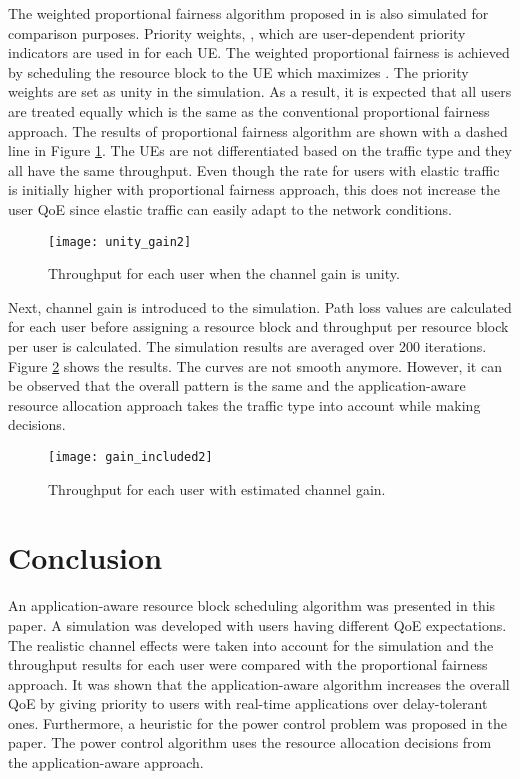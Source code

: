 \documentclass[journal]{IEEEtran} 				\IEEEoverridecommandlockouts 	\usepackage{amsmath,amssymb}
\begin{document}
The weighted proportional fairness algorithm proposed in \cite{SelfOrganizedLTE} is also simulated for comparison purposes. Priority weights, , which are user-dependent priority indicators are used in \cite{SelfOrganizedLTE} for each UE. The weighted proportional fairness is achieved by scheduling the resource block to the UE which maximizes . The priority weights are set as unity in the simulation. As a result, it is expected that all users are treated equally which is the same as the conventional proportional fairness approach. The results of proportional fairness algorithm are shown with a dashed line in Figure \ref{fig:sim:UnityGain}. The UEs are not differentiated based on the traffic type and they all have the same throughput. Even though the rate for users with elastic traffic is initially higher with proportional fairness approach, this does not increase the user QoE since elastic traffic can easily adapt to the network conditions.  
 
\begin{figure}
    \centering
    \texttt{[image: unity\_gain2]}
    \captionsetup{justification=centering}
    \caption{Throughput for each user when the channel gain is unity.}
    \label{fig:sim:UnityGain}
\end{figure} 

Next, channel gain is introduced to the simulation. Path loss values are calculated for each user before assigning a resource block and throughput per resource block per user is calculated. The simulation results are averaged over 200 iterations. Figure \ref{fig:sim:GainIncluded} shows the results. The curves are not smooth anymore. However, it can be observed that the overall pattern is the same and the application-aware resource allocation approach takes the traffic type into account while making decisions.

\begin{figure}
    \centering
    \texttt{[image: gain\_included2]}
    \captionsetup{justification=centering}
    \caption{Throughput for each user with estimated channel gain.}
    \label{fig:sim:GainIncluded}
\end{figure} 

\section{Conclusion}\label{sec:conclude}
An application-aware resource block scheduling algorithm was presented in this paper. A simulation was developed with users having different QoE expectations. The realistic channel effects were taken into account for the simulation and the throughput results for each user were compared with the proportional fairness approach. It was shown that the application-aware algorithm increases the overall QoE by giving priority to users with real-time applications over delay-tolerant ones. Furthermore, a heuristic for the power control problem was proposed in the paper. The power control algorithm uses the resource allocation decisions from the application-aware approach.


\end{document}
